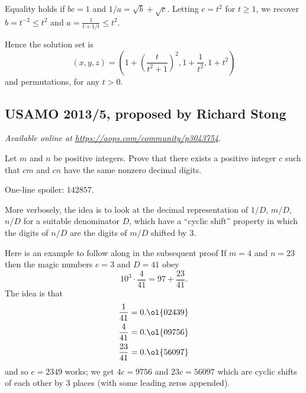 \documentclass[11pt]{scrartcl}
\begin{document}
Equality holds if $bc = 1$ and $1/a = \sqrt b + \sqrt c$.
Letting $c = t^2$ for $t \ge 1$,
we recover $b = t^{-2} \le t^2$ and $a = \frac{1}{t+1/t} \le t^2$.

Hence the solution set is
\[ (x,y,z) = \left( 1 + \left( \frac{t}{t^2+1} \right)^2,
  1 + \frac{1}{t^2}, 1 + t^2 \right) \]
and permutations, for any $t > 0$.
\pagebreak

\subsection{USAMO 2013/5, proposed by Richard Stong}
\textsl{Available online at \url{https://aops.com/community/p3043754}.}
\begin{mdframed}[style=mdpurplebox,frametitle={Problem statement}]
Let $m$ and $n$ be positive integers.
Prove that there exists a positive integer $c$
such that $cm$ and $cn$ have the same nonzero decimal digits.
\end{mdframed}
One-line spoiler: $142857$.

More verbosely,
the idea is to look at the decimal representation of $1/D$, $m/D$, $n/D$
for a suitable denominator $D$, which have a ``cyclic shift'' property
in which the digits of $n/D$ are the digits of $m/D$ shifted by $3$.

\begin{remark*}
  Here is an example to follow along in the subsequent proof
  If $m = 4$ and $n = 23$ then the magic numbers $e = 3$ and $D = 41$ obey
  \[ 10^3 \cdot \frac{4}{41} = 97 + \frac{23}{41}. \]
  The idea is that
  \begin{align*}
    \frac{1}{41} &= 0.\ol{02439} \\
    \frac{4}{41} &= 0.\ol{09756} \\
    \frac{23}{41} &= 0.\ol{56097}
  \end{align*}
  and so $c = 2349$ works;
  we get $4c = 9756$ and $23c = 56097$
  which are cyclic shifts of each other by $3$ places
  (with some leading zeros appended).
\end{remark*}
\end{document}
